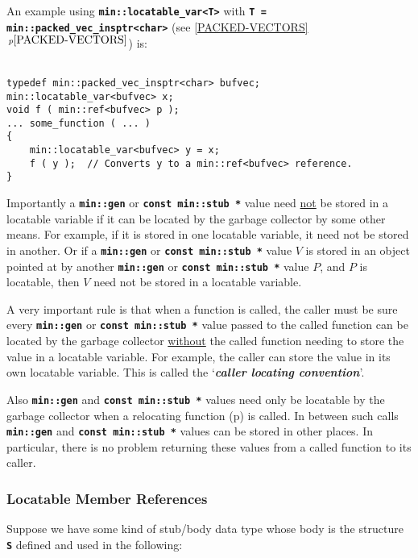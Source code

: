 \documentclass[12pt]{article}
\newcommand{\TT}[1]{{\tt \bfseries #1}}
\newcommand{\key}[1]{{\bf \em #1}\index{#1}}
\newcommand{\itemref}[1]{\ref{#1}$\,^{p\pageref{#1}}$}
\newcommand{\pagref}[1]{p\pageref{#1}}
\newcommand{\EOL}{\penalty \exhyphenpenalty}
\newenvironment{indpar}[1][0.3in]%
	{\begin{list}{}%
		     {\setlength{\itemsep}{0in}%
		      \setlength{\topsep}{0in}%
		      \setlength{\parsep}{1ex}%
		      \setlength{\labelwidth}{#1}%
		      \setlength{\leftmargin}{#1}%
		      \addtolength{\leftmargin}{\labelsep}}%
	 \item}%
	{\end{list}}
\begin{document}
An example using \TT{min::\EOL locatable\_\EOL var<T>} with
\TT{T = min::\EOL packed\_\EOL vec\_\EOL insptr<char>}
(see \itemref{PACKED-VECTORS}) is:

\begin{indpar}\begin{verbatim}

typedef min::packed_vec_insptr<char> bufvec;
min::locatable_var<bufvec> x;
void f ( min::ref<bufvec> p );
... some_function ( ... )
{
    min::locatable_var<bufvec> y = x;
    f ( y );  // Converts y to a min::ref<bufvec> reference.
}
\end{verbatim}\end{indpar}

Importantly a \TT{min::gen} or \TT{const min::stub *}
value need \underline{not} be stored
in a locatable variable if it can be located by the garbage collector by some
other means.  For example, if it is stored in one locatable variable,
it need not be stored in another.  Or if a \TT{min::gen}
or \TT{const min::\EOL stub~*} value
$V$ is stored in an object pointed at by another \TT{min::gen}
or \TT{const min::\EOL stub~*}
value $P$, and $P$ is locatable, then $V$ need not
be stored in a locatable variable.

A very important rule is that when a function is called, the caller
must be sure every \TT{min::gen}
or \TT{const min::\EOL stub~*} value passed to the called
function can be located by the garbage collector \underline{without} the called
function needing to store the value in a locatable variable.
For example, the caller can store the value in its own locatable
variable.  This is called the `\key{caller locating convention}'.

Also \TT{min::gen} and \TT{const min::\EOL stub~*}
values need only be locatable by
the garbage collector when a relocating function (\pagref{RELOCATING-FUNCTIONS})
is called.  In between such calls \TT{min::gen}
and \TT{const min::\EOL stub *} values can be
stored in other places.  In particular, there is no problem
returning these values from a called function to its caller.

\subsubsection{Locatable Member References}
\label{LOCATABLE-MEMBER-REFERENCES}

Suppose we have some kind of stub/body data type whose body
is the structure \TT{S} defined and used in the following:
\end{document}

